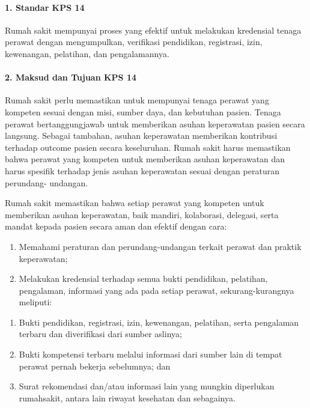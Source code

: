 \documentclass[
]{book}
\providecommand{\tightlist}{%
  \setlength{\itemsep}{0pt}\setlength{\parskip}{0pt}}
\begin{document}
\hypertarget{standar-kps-14}{%
\paragraph*{1. Standar KPS 14}\label{standar-kps-14}}

Rumah sakit mempunyai proses yang efektif untuk melakukan kredensial tenaga perawat dengan mengumpulkan, verifikasi pendidikan, registrasi, izin, kewenangan, pelatihan, dan pengalamannya.

\hypertarget{maksud-dan-tujuan-kps-14}{%
\paragraph*{2. Maksud dan Tujuan KPS 14}\label{maksud-dan-tujuan-kps-14}}

Rumah sakit perlu memastikan untuk mempunyai tenaga perawat yang kompeten sesuai dengan misi, sumber daya, dan kebutuhan pasien. Tenaga perawat bertanggungjawab untuk memberikan asuhan keperawatan pasien secara langsung. Sebagai tambahan, asuhan keperawatan memberikan kontribusi terhadap outcome pasien secara keseluruhan. Rumah sakit harus memastikan bahwa perawat yang kompeten untuk memberikan asuhan keperawatan dan harus spesifik terhadap jenis asuhan keperawatan sesuai dengan peraturan perundang- undangan.

Rumah sakit memastikan bahwa setiap perawat yang kompeten untuk memberikan asuhan keperawatan, baik mandiri, kolaborasi, delegasi, serta mandat kepada pasien secara aman dan efektif dengan cara:

\begin{enumerate}
\def\labelenumi{\alph{enumi}.}
\tightlist
\item
  Memahami peraturan dan perundang-undangan terkait perawat dan praktik keperawatan;
\item
  Melakukan kredensial terhadap semua bukti pendidikan, pelatihan, pengalaman, informasi yang ada pada setiap perawat, sekurang-kurangnya meliputi:
\end{enumerate}

\begin{enumerate}
\def\labelenumi{\arabic{enumi}.}
\tightlist
\item
  Bukti pendidikan, registrasi, izin, kewenangan, pelatihan, serta pengalaman terbaru dan diverifikasi dari sumber aslinya;
\item
  Bukti kompetensi terbaru melalui informasi dari sumber lain di tempat perawat pernah bekerja sebelumnya; dan
\item
  Surat rekomendasi dan/atau informasi lain yang mungkin diperlukan rumahsakit, antara lain riwayat kesehatan dan sebagainya.
\end{enumerate}
\end{document}
